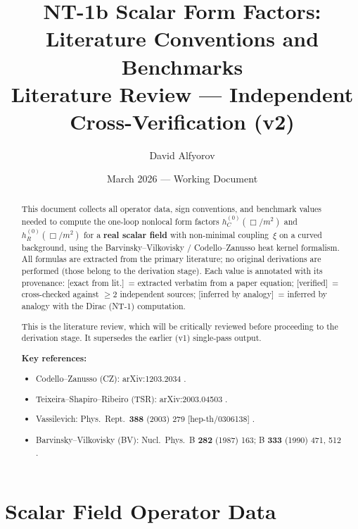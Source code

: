 \documentclass[12pt,a4paper]{article}
\title{\textbf{NT-1b Scalar Form Factors:\\[4pt]
       Literature Conventions and Benchmarks}\\[8pt]
       {\normalsize Literature Review --- Independent Cross-Verification (v2)}}
\author{David Alfyorov}
\date{March 2026 --- Working Document}
\theoremstyle{definition}
\theoremstyle{remark}
\newcommand{\exactlit}{\textcolor{blue!60!black}{\textsf{[exact from lit.]}}}
\newcommand{\verified}{\textcolor{green!50!black}{\textsf{[verified]}}}
\newcommand{\inferred}{\textcolor{orange!60!black}{\textsf{[inferred by analogy]}}}
\begin{document}
\maketitle

\begin{center}
\end{center}

\thispagestyle{empty}

\begin{abstract}
This document collects all operator data, sign conventions, and benchmark
values needed to compute the one-loop nonlocal form factors
$h_C^{(0)}(\Box/m^2)$ and $h_R^{(0)}(\Box/m^2)$ for a
\textbf{real scalar field} with non-minimal coupling~$\xi$ on a curved
background, using the Barvinsky--Vilkovisky / Codello--Zanusso heat
kernel formalism.  All formulas are extracted from the primary literature;
no original derivations are performed (those belong to the derivation stage).
Each value is annotated with its provenance:
\exactlit\ = extracted verbatim from a paper equation;
\verified\ = cross-checked against $\geq 2$ independent sources;
\inferred\ = inferred by analogy with the Dirac (NT-1) computation.

This is the literature review, which will be critically
reviewed before proceeding to the derivation stage.
It supersedes the earlier (v1) single-pass output.

\medskip\noindent
\textbf{Key references:}
\begin{itemize}[nosep]
\item Codello--Zanusso (CZ): arXiv:1203.2034 \cite{CZ2012}.
\item Teixeira--Shapiro--Ribeiro (TSR): arXiv:2003.04503 \cite{TSR2020}.
\item Vassilevich: Phys.\ Rept.\ \textbf{388} (2003) 279
  [hep-th/0306138] \cite{Vassilevich2003}.
\item Barvinsky--Vilkovisky (BV): Nucl.\ Phys.\ B \textbf{282} (1987) 163;
  B \textbf{333} (1990) 471, 512 \cite{BV1987,BV1990a}.
\end{itemize}
\end{abstract}

\tableofcontents
\newpage

\section{Scalar Field Operator Data}
\label{sec:operator-data}
\end{document}
